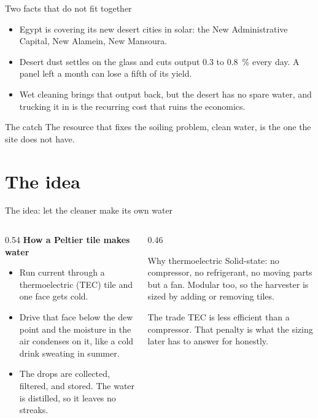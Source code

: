 \documentclass[aspectratio=169,10pt]{beamer}
\begin{document}
\begin{frame}{Two facts that do not fit together}
  \begin{itemize}\setlength\itemsep{0.55em}
    \item Egypt is covering its new desert cities in solar: the New Administrative Capital, New Alamein, New Mansoura.
    \item Desert dust settles on the glass and cuts output \SI{0.3}{} to \SI{0.8}{\percent} every day. A panel left a month can lose a fifth of its yield.
    \item Wet cleaning brings that output back, but the desert has no spare water, and trucking it in is the recurring cost that ruins the economics.
  \end{itemize}
  \vspace{0.4em}
  \begin{block}{The catch}
    The resource that fixes the soiling problem, clean water, is the one the site does not have.
  \end{block}
\end{frame}

\section{The idea}

\begin{frame}{The idea: let the cleaner make its own water}
  \begin{columns}[T]
    \begin{column}{0.54\textwidth}
      \textbf{How a Peltier tile makes water}
      \begin{itemize}\small\setlength\itemsep{0.4em}
        \item Run current through a thermoelectric (TEC) tile and one face gets cold.
        \item Drive that face below the dew point and the moisture in the air condenses on it, like a cold drink sweating in summer.
        \item The drops are collected, filtered, and stored. The water is distilled, so it leaves no streaks.
      \end{itemize}
    \end{column}
    \begin{column}{0.46\textwidth}
      \begin{block}{Why thermoelectric}
        Solid-state: no compressor, no refrigerant, no moving parts but a fan. Modular too, so the harvester is sized by adding or removing tiles.
      \end{block}
      \begin{block}{The trade}
        TEC is less efficient than a compressor. That penalty is what the sizing later has to answer for honestly.
      \end{block}
    \end{column}
  \end{columns}
\end{frame}
\end{document}
